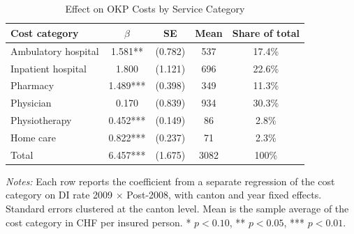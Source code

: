 \begin{table}[H]
\centering
\caption{Effect on OKP Costs by Service Category}
\begin{threeparttable}
\begin{tabular}{lcccc}
\toprule
Cost category & $\hat{\beta}$ & SE & Mean & Share of total \\
\midrule
Ambulatory hospital & 1.581** & (0.782) & 537 & 17.4\% \\
Inpatient hospital & 1.800 & (1.121) & 696 & 22.6\% \\
Pharmacy & 1.489*** & (0.398) & 349 & 11.3\% \\
Physician & 0.170 & (0.839) & 934 & 30.3\% \\
Physiotherapy & 0.452*** & (0.149) & 86 & 2.8\% \\
Home care & 0.822*** & (0.237) & 71 & 2.3\% \\
\midrule
Total & 6.457*** & (1.675) & 3082 & 100\% \\
\bottomrule
\end{tabular}
\begin{tablenotes}[flushleft]
\small
\item \textit{Notes:} Each row reports the coefficient from a separate regression of the cost category on DI rate 2009 $\times$ Post-2008, with canton and year fixed effects. Standard errors clustered at the canton level. Mean is the sample average of the cost category in CHF per insured person. * $p<0.10$, ** $p<0.05$, *** $p<0.01$.
\end{tablenotes}
\end{threeparttable}
\label{tab:decomp}
\end{table}
